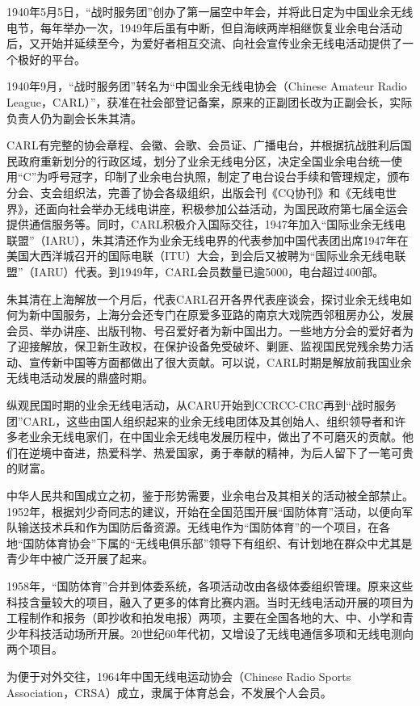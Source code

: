 \documentclass[12pt,UTF8]{ctexbook}
\begin{document}
1940年5月5日，“战时服务团”创办了第一届空中年会，并将此日定为中国业余无线电节，每年举办一次，1949年后虽有中断，但自海峡两岸相继恢复业余电台活动后，又开始并延续至今，为爱好者相互交流、向社会宣传业余无线电活动提供了一个极好的平台。

1940年9月，“战时服务团”转名为“中国业余无线电协会（Chinese Amateur Radio League，CARL）”，获准在社会部登记备案，原来的正副团长改为正副会长，实际负责人仍为副会长朱其清。

CARL有完整的协会章程、会徽、会歌、会员证、广播电台，并根据抗战胜利后国民政府重新划分的行政区域，划分了业余无线电分区，决定全国业余电台统一使用“C”为呼号冠字，印制了业余电台执照，制定了电台设台手续和管理规定，颁布分会、支会组织法，完善了协会各级组织，出版会刊《CQ协刊》和《无线电世界》，还面向社会举办无线电讲座，积极参加公益活动，为国民政府第七届全运会提供通信服务等。同时，CARL积极介入国际交往，1947年加入“国际业余无线电联盟”（IARU），朱其清还作为业余无线电界的代表参加中国代表团出席1947年在美国大西洋城召开的国际电联（ITU）大会，到会后又被聘为“国际业余无线电联盟”（IARU）代表。到1949年，CARL会员数量已逾5000，电台超过400部。

朱其清在上海解放一个月后，代表CARL召开各界代表座谈会，探讨业余无线电如何为新中国服务，上海分会还专门在原爱多亚路的南京大戏院西邻租房办公，发展会员、举办讲座、出版刊物、号召爱好者为新中国出力。一些地方分会的爱好者为了迎接解放，保卫新生政权，在保护设备免受破坏、剿匪、监视国民党残余势力活动、宣传新中国等方面都做出了很大贡献。可以说，CARL时期是解放前我国业余无线电活动发展的鼎盛时期。

纵观民国时期的业余无线电活动，从CARU开始到CCRCC-CRC再到“战时服务团”CARL，这些由国人组织起来的业余无线电团体及其创始人、组织领导者和许多老业余无线电家们，在中国业余无线电发展历程中，做出了不可磨灭的贡献。他们在逆境中奋进，热爱科学、热爱国家，勇于奉献的精神，为后人留下了一笔可贵的财富。

中华人民共和国成立之初，鉴于形势需要，业余电台及其相关的活动被全部禁止。1952年，根据刘少奇同志的建议，开始在全国范围开展“国防体育”活动，以便向军队输送技术兵和作为国防后备资源。无线电作为“国防体育”的一个项目，在各地“国防体育协会”下属的“无线电俱乐部”领导下有组织、有计划地在群众中尤其是青少年中被广泛开展了起来。

1958年，“国防体育”合并到体委系统，各项活动改由各级体委组织管理。原来这些科技含量较大的项目，融入了更多的体育比赛内涵。当时无线电活动开展的项目为工程制作和报务（即抄收和拍发电报）两项，主要在全国各地的大、中、小学和青少年科技活动场所开展。20世纪60年代初，又增设了无线电通信多项和无线电测向两个项目。

为便于对外交往，1964年中国无线电运动协会（Chinese Radio Sports Association，CRSA）成立，隶属于体育总会，不发展个人会员。
\end{document}
